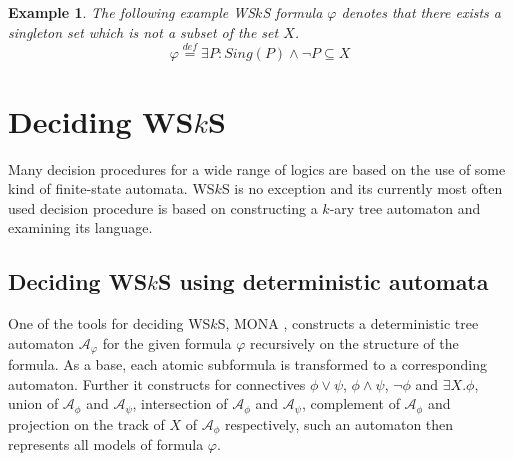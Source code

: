 \documentclass{eeict}
\newtheorem{example}{Example}[section]
\begin{document}
\begin{example} The following example WS$k$S formula $\varphi$ denotes that there
exists a singleton set which is not a subset of the set $X$.
\begin{equation}
 \varphi \overset{\mathit{def}}{=} \exists P: Sing(P) \wedge\neg P \subseteq X
 \label{varphi}
\end{equation}
\end{example}

\section{Deciding WS$k$S}

Many decision procedures for a wide range of logics are based on the use of some
kind of finite-state automata. WS$k$S is no exception and its currently most
often used decision procedure is based on constructing a $k$-ary tree automaton
and examining its language.

\subsection{Deciding WS$k$S using deterministic automata}

One of the tools for deciding WS$k$S, MONA \cite{mona}, constructs a
deterministic tree automaton $\mathcal{A}_\varphi$ for the given formula
$\varphi$ recursively on the structure of the formula. As a base, each atomic
subformula is transformed to a corresponding automaton.
Further it constructs for connectives $\phi \vee
\psi$, $\phi \wedge \psi$, $\neg \phi$ and $\exists X. \phi$, union of
$\mathcal{A}_\phi$ and $\mathcal{A}_\psi$, intersection of $\mathcal{A}_\phi$
and $\mathcal{A}_\psi$, complement of $\mathcal{A}_\phi$ and projection on the
track of $X$ of $\mathcal{A}_\phi$ respectively, such an automaton then
represents all models of formula $\varphi$.
\end{document}
